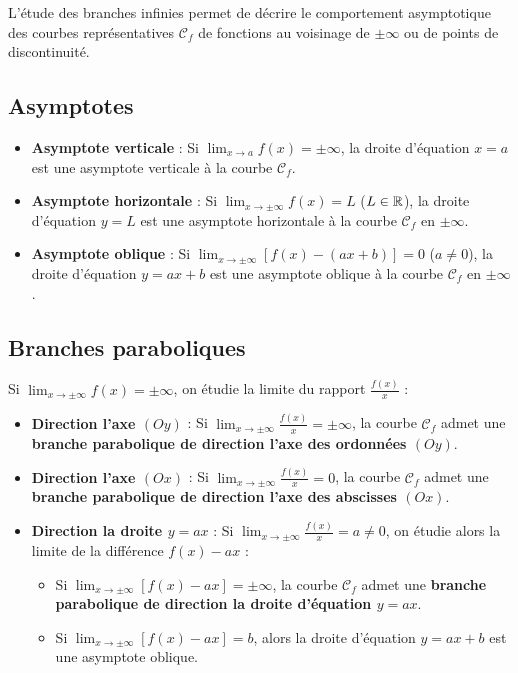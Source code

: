 L'étude des branches infinies permet de décrire le comportement asymptotique des courbes représentatives $\mathcal{C}_f$ de fonctions au voisinage de $\pm\infty$ ou de points de discontinuité.

\subsection{Asymptotes}
\begin{itemize}
    \item \textbf{Asymptote verticale} : Si $\lim_{x \to a} f(x) = \pm\infty$, la droite d'équation $x = a$ est une asymptote verticale à la courbe $\mathcal{C}_f$.
    \item \textbf{Asymptote horizontale} : Si $\lim_{x \to \pm\infty} f(x) = L$ ($L \in \mathbb{R}$), la droite d'équation $y = L$ est une asymptote horizontale à la courbe $\mathcal{C}_f$ en $\pm\infty$.
    \item \textbf{Asymptote oblique} : Si $\lim_{x \to \pm\infty} [f(x) - (ax+b)] = 0$ ($a \ne 0$), la droite d'équation $y = ax+b$ est une asymptote oblique à la courbe $\mathcal{C}_f$ en $\pm\infty$.
\end{itemize}

\subsection{Branches paraboliques}
Si $\lim_{x \to \pm\infty} f(x) = \pm\infty$, on étudie la limite du rapport $\frac{f(x)}{x}$ :
\begin{itemize}
    \item \textbf{Direction l'axe $(Oy)$} : Si $\lim_{x \to \pm\infty} \frac{f(x)}{x} = \pm\infty$, la courbe $\mathcal{C}_f$ admet une \textbf{branche parabolique de direction l'axe des ordonnées $(Oy)$}.
    \item \textbf{Direction l'axe $(Ox)$} : Si $\lim_{x \to \pm\infty} \frac{f(x)}{x} = 0$, la courbe $\mathcal{C}_f$ admet une \textbf{branche parabolique de direction l'axe des abscisses $(Ox)$}.
    \item \textbf{Direction la droite $y = ax$} : Si $\lim_{x \to \pm\infty} \frac{f(x)}{x} = a \ne 0$, on étudie alors la limite de la différence $f(x) - ax$ :
    \begin{itemize}
        \item Si $\lim_{x \to \pm\infty} [f(x) - ax] = \pm\infty$, la courbe $\mathcal{C}_f$ admet une \textbf{branche parabolique de direction la droite d'équation $y = ax$}.
        \item Si $\lim_{x \to \pm\infty} [f(x) - ax] = b$, alors la droite d'équation $y = ax+b$ est une asymptote oblique.
    \end{itemize}
\end{itemize}

